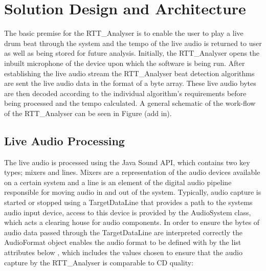 \documentclass[a4paper, 11pt]{article}
\begin{document}
\maketitle{} \section{Solution Design and Architecture}
The basic premise for the RTT\_Analyser is to enable the user to play a live drum beat through the system and the tempo of the live audio is returned to user as well as being stored for future analysis. Initially, the RTT\_Analyser opens the inbuilt microphone of the device upon which the software is being run. After establishing the live audio stream the RTT\_Analyser beat detection algorithms are sent the live audio data in the format of a byte array. These live audio bytes are then decoded according to the individual algorithm's requirements before being processed and the tempo calculated. A general schematic of the work-flow of the RTT\_Analyser can be seen in Figure (add in).

\subsection{Live Audio Processing}
\label{sec: liveaudio}
The live audio is processed using the Java Sound API, which contains two key types; mixers and lines. Mixers are a representation of the audio devices available on a certain system and a line is an element of the digital audio pipeline responsible for moving audio in and out of the system. Typically, audio capture is started or stopped using a TargetDataLine that provides a path to the systems audio input device, access to this device is provided by the AudioSystem class, which acts a clearing house for audio components. In order to ensure the bytes of audio data passed through the TargetDataLine are interpreted correctly the AudioFormat object enables the audio format to be defined with by the list attributes below \cite{javasound}, which includes the values chosen to ensure that the audio capture by the RTT\_Analyser is comparable to CD quality:
\end{document}
